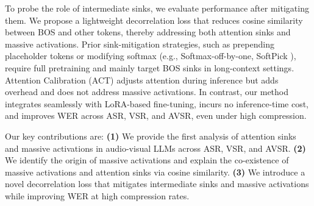 \documentclass{article}
\begin{document}
To probe the role of intermediate sinks, we evaluate performance after mitigating them. We propose a lightweight decorrelation loss that reduces cosine similarity between BOS and other tokens, thereby addressing both attention sinks and massive activations. Prior sink-mitigation strategies, such as prepending placeholder tokens or modifying softmax (e.g., Softmax-off-by-one, SoftPick \cite{xiao2023streamingllm, zuhri2025softpick}), require full pretraining and mainly target BOS sinks in long-context settings. Attention Calibration (ACT) \cite{yu2024unveiling} adjusts attention during inference but adds overhead and does not address massive activations. In contrast, our method integrates seamlessly with LoRA-based fine-tuning, incurs no inference-time cost, and improves WER across ASR, VSR, and AVSR, even under high compression.




Our key contributions are: \textbf{(1)} We provide the first analysis of attention sinks and massive activations in audio-visual LLMs across ASR, VSR, and AVSR. \textbf{(2)} We identify the origin of massive activations and explain the co-existence of massive activations and attention sinks via cosine similarity. \textbf{(3)} We introduce a novel decorrelation loss that mitigates intermediate sinks and massive activations while improving WER at high compression rates.
\end{document}
